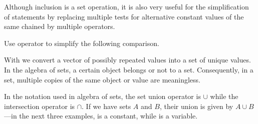 \documentclass[krantz2]{krantz}\usepackage{knitr}
\begin{document}
Although inclusion is a set operation, it is also very useful for the simplification of  statements by replacing multiple tests for alternative constant values of the same  chained by multiple \Roperator{|} operators.

\begin{playground}
Use operator  to simplify the following comparison.

\begin{knitrout}\footnotesize
{}\color{fgcolor}\begin{kframe}
\begin{alltt}
 \hlkwb{<-} \hlstd{(}\hlstd{,} \hlstd{,} \hlstd{)}
 \hlopt{==}  \hlopt{|}  \hlopt{==}  \hlopt{|}  \hlopt{==}  \hlopt{|}  \hlopt{==} 
\end{alltt}
\end{kframe}
\end{knitrout}
\end{playground}

With  we convert a vector of possibly repeated values into a set of unique values. In the algebra of sets, a certain object belongs or not to a set. Consequently, in a set, multiple copies of the same object or value are meaningless.

\begin{knitrout}\footnotesize
{}\color{fgcolor}
\end{knitrout}

In the notation used in algebra of sets, the set union operator is $\cup$ while the intersection operator is $\cap$. If we have sets $A$ and $B$, their union is given by $A \cup B$---in the next three examples,  is a constant, while  is a variable.
\end{document}
